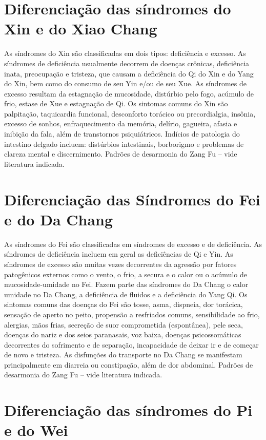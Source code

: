 \documentclass[12pt,oneside,a4paper]{book} %
\begin{document}
\section{Diferenciação das síndromes do Xin e do Xiao Chang}

As síndromes do Xin são classificadas em dois tipos: deficiência e excesso. 
As síndromes de deficiência usualmente decorrem de doenças crônicas, deficiência inata, preocupação e tristeza, que causam a deficiência do Qi do Xin e do Yang do Xin, bem como do consumo de seu Yin e/ou de seu Xue. As síndromes de excesso resultam da estagnação de mucosidade, distúrbio pelo fogo, acúmulo de frio, estase de Xue e estagnação de Qi. 
Os sintomas comuns do Xin são palpitação, taquicardia funcional, desconforto torácico ou precordialgia, insônia, excesso de sonhos, enfraquecimento da memória, delírio, gagueira, afasia e inibição da fala, além de transtornos psiquiátricos.
Indícios de patologia do intestino delgado incluem: distúrbios intestinais, borborigmo e problemas de clareza mental e discernimento.
Padrões de desarmonia do Zang Fu – vide literatura indicada.

\section{Diferenciação das Síndromes do Fei e do Da Chang}

As síndromes do Fei são classificadas em síndromes de excesso e de deficiência. As síndromes de deficiência incluem em geral as deficiências de Qi e Yin. As síndromes de excesso são muitas vezes decorrentes da agressão por fatores patogênicos externos como o vento, o frio, a secura e o calor ou o acúmulo de mucosidade-umidade no Fei.
Fazem parte das síndromes do Da Chang o calor umidade no Da Chang, a deficiência de fluidos e a deficiência do Yang Qi. 
Os sintomas comuns das doenças do Fei são tosse, asma, dispneia, dor torácica, sensação de aperto no peito, propensão a resfriados comuns, sensibilidade ao frio, alergias, mãos frias, secreção de suor comprometida (espontânea), pele seca, doenças do nariz e dos seios paranasais, voz baixa, doenças psicossomáticas decorrentes do sofrimento e de separação, incapacidade de deixar ir e de começar de novo e tristeza.
As disfunções do transporte no Da Chang se manifestam principalmente em diarreia ou constipação, além de dor abdominal.
Padrões de desarmonia do Zang Fu – vide literatura indicada.

\section{Diferenciação das síndromes do Pi e do Wei}
	
\end{document}
